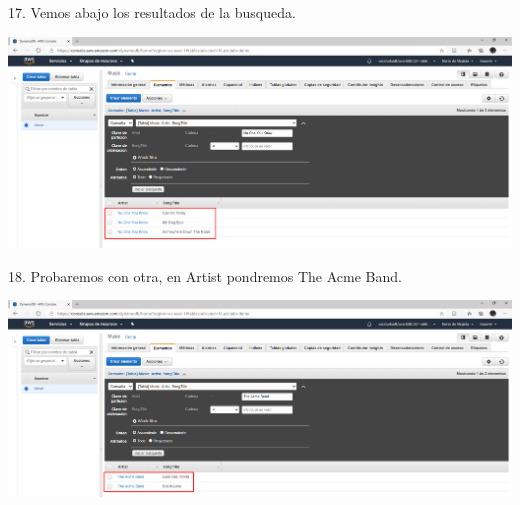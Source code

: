 \documentclass[12pt,letterpaper]{article}
\begin{document}
17.	Vemos abajo los resultados de la busqueda.
\begin{center}
    \includegraphics[width=15cm]{img/17.png}  
\end{center}


18.	Probaremos con otra, en Artist pondremos The Acme Band.
\begin{center}
    \includegraphics[width=15cm]{img/18.png}  
\end{center}
\newpage
\end{document}
